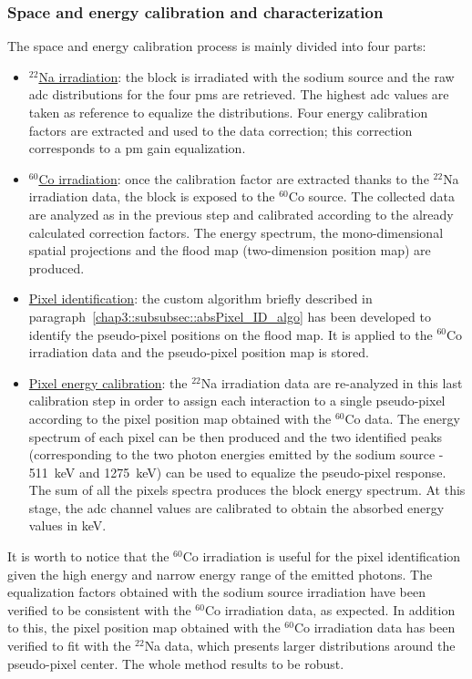 \subsubsection{Space and energy calibration and characterization}\label{chap3::subsubsec::absSpaceEnMethod}

The space and energy calibration process is mainly divided into four parts:
\begin{itemize}
\item \underline{$^{22}$Na irradiation}: the block is irradiated with the sodium source and the raw \gls{adc} distributions for the four \glspl{pm} are retrieved. The highest \gls{adc} values are taken as reference to equalize the distributions. Four energy calibration factors are extracted and used to the data correction; this correction corresponds to a \gls{pm} gain equalization.

\item \underline{$^{60}$Co irradiation}: once the calibration factor are extracted thanks to the $^{22}$Na irradiation data, the block is exposed to the $^{60}$Co source. The collected data are analyzed as in the previous step and calibrated according to the already calculated correction factors. The energy spectrum, the mono-dimensional spatial projections and the flood map (two-dimension position map) are produced.

\item \underline{Pixel identification}: the custom algorithm briefly described in paragraph~\ref{chap3::subsubsec::absPixel_ID_algo} has been developed to identify the pseudo-pixel positions on the flood map. It is applied to the $^{60}$Co irradiation data and the pseudo-pixel position map is stored. 

\item \underline{Pixel energy calibration}: the $^{22}$Na irradiation data are re-analyzed in this last calibration step in order to assign each interaction to a single pseudo-pixel according to the pixel position map obtained with the $^{60}$Co data. The energy spectrum of each pixel can be then produced and the two identified peaks (corresponding to the two photon energies emitted by the sodium source - 511~keV and 1275~keV) can be used to equalize the pseudo-pixel response. The sum of all the pixels spectra produces the block energy spectrum. At this stage, the \gls{adc} channel values are calibrated to obtain the absorbed energy values in keV.     
\end{itemize}

It is worth to notice that the $^{60}$Co irradiation is useful for the pixel identification given the high energy and narrow energy range of the emitted photons. The equalization factors obtained with the sodium source irradiation have been verified to be consistent with the $^{60}$Co irradiation data, as expected. In addition to this, the pixel position map obtained with the $^{60}$Co irradiation data has been verified to fit with the $^{22}$Na data, which presents larger distributions around the pseudo-pixel center. The whole method results to be robust.  

